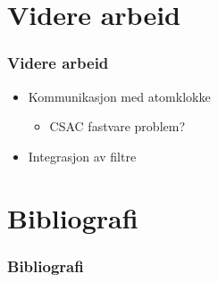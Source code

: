 \documentclass[xcolor=table]{beamer}
\begin{document}
\section{Videre arbeid}
\begin{frame}
    \frametitle{Videre arbeid}
  \begin{itemize}
      \setlength\itemsep{2em}
  \item Kommunikasjon med atomklokke
    \begin{itemize}
      \item CSAC fastvare problem?
    \end{itemize}
  \item Integrasjon av filtre
  \end{itemize}
\end{frame}

\section{Bibliografi}
\begin{frame}[allowframebreaks]%
  \frametitle{Bibliografi}
  \printbibliography[heading=bibintoc]
\end{frame}
\end{document}
